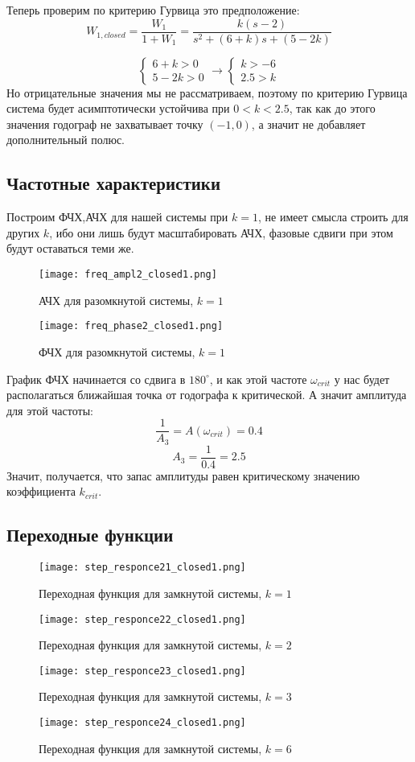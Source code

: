 Теперь проверим по критерию Гурвица это предположение:
$$
    W_{1,closed} = \frac{W_1}{1+W_1} = \frac{k(s-2)}{s^2 + (6+k)s + (5-2k)}
$$

$$
    \begin{cases}
        6+k > 0 \\
        5-2k > 0
    \end{cases} \to
    \begin{cases}
        k > -6 \\
        2.5 > k
    \end{cases}
$$
Но отрицательные значения мы не рассматриваем, поэтому по критерию Гурвица система будет асимптотически устойчива при $0 < k < 2.5$,
так как до этого значения годограф не захватывает точку $(-1, 0)$, а значит не добавляет дополнительный полюс.
\newpage
\subsection{Частотные характеристики}
Построим ФЧХ,АЧХ для нашей системы при $k=1$, не имеет смысла строить для других $k$, ибо они лишь будут масштабировать АЧХ, фазовые сдвиги при этом будут оставаться теми же.
\begin{figure}[ht]
    \centering
    \texttt{[image: freq\_ampl2\_closed1.png]}
    \caption{АЧХ для разомкнутой системы, $k=1$}
\end{figure}
\begin{figure}[ht]
    \centering
    \texttt{[image: freq\_phase2\_closed1.png]}
    \caption{ФЧХ для разомкнутой системы, $k=1$}
\end{figure}

График ФЧХ начинается со сдвига в $180^\circ$, и как этой частоте $\omega_{crit}$ у нас будет располагаться ближайшая точка от годографа к критической. А значит амплитуда для этой частоты:
$$
\frac{1}{A_3} = A(\omega_{crit}) = 0.4
$$
$$
A_3 = \frac{1}{0.4} = 2.5
$$
Значит, получается, что запас амплитуды равен критическому значению коэффициента $k_{crit}$.

\newpage
\subsection{Переходные функции}
\begin{figure}[ht]
    \centering
    \texttt{[image: step\_responce21\_closed1.png]}
    \caption{Переходная функция для замкнутой системы, $k=1$}
\end{figure}
\begin{figure}[ht]
    \centering
    \texttt{[image: step\_responce22\_closed1.png]}
    \caption{Переходная функция для замкнутой системы, $k=2$}
\end{figure}
\begin{figure}[ht]
    \centering
    \texttt{[image: step\_responce23\_closed1.png]}
    \caption{Переходная функция для замкнутой системы, $k=3$}
\end{figure}
\begin{figure}[ht]
    \centering
    \texttt{[image: step\_responce24\_closed1.png]}
    \caption{Переходная функция для замкнутой системы, $k=6$}
\end{figure}

